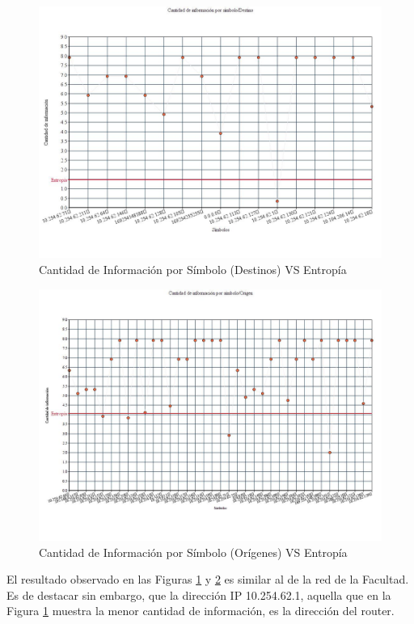 \begin{figure}[H]
  \centering
    \includegraphics[scale=0.45]{imagenes/graficos/entropiaCantInf/04destino.jpg}
  \caption{Cantidad de Información por Símbolo (Destinos) VS Entropía}
  \label{fig:10}
\end{figure}

\begin{figure}[H]
  \centering
    \includegraphics[scale=0.45]{imagenes/graficos/entropiaCantInf/04origen.jpg}
  \caption{Cantidad de Información por Símbolo (Orígenes) VS Entropía}
  \label{fig:11}
\end{figure}

El resultado observado en las Figuras \ref{fig:10} y \ref{fig:11} es similar al de la red de la Facultad. Es de destacar sin embargo, que la dirección IP 10.254.62.1, aquella que en la Figura \ref{fig:10} muestra la menor cantidad de información, es la dirección del router.

